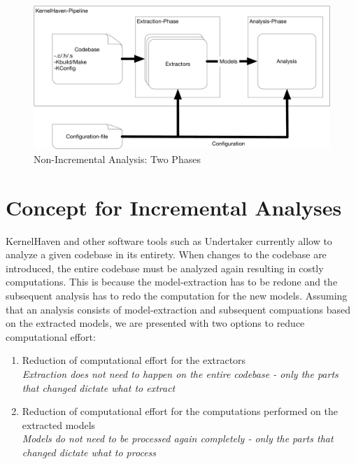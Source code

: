 \documentclass[a4paper]{article}
\begin{document}
\begin{figure}[h] 
  \centering
  \begin{minipage}[b]{1\textwidth} 
    \caption[Non-Incremental Analysis: Two Phases]{Non-Incremental Analysis: Two Phases}\label{2-phases}
    \includegraphics[width=1\textwidth]{img/KernelHaven.pdf}
  \end{minipage}
\end{figure}




\newpage
\section{Concept for Incremental Analyses}

KernelHaven and other software tools such as Undertaker\cite{Tartler:2011:FCC:1966445.1966451} currently allow to analyze a given codebase in its entirety. When changes to the codebase are introduced, the entire codebase must be analyzed again resulting in costly computations. This is because the model-extraction has to be redone and the subsequent analysis has to redo the computation for the new models. Assuming that an analysis consists of model-extraction and subsequent compuations based on the extracted models, we are presented with two options to reduce computational effort:

\begin{enumerate}
	\item Reduction of computational effort for the extractors \\
	\emph{Extraction does not need to happen on the entire codebase - only the parts that changed dictate what to extract}
	\item Reduction of computational effort for the computations performed on the extracted models \\
	\emph{Models do not need to be processed again completely - only the parts that changed dictate what to process}
\end{enumerate}
\end{document}
